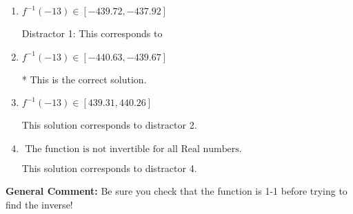 \documentclass{extbook}[14pt]
\begin{document}
\begin{enumerate}
{\begin{enumerate}[label=\Alph*.]
 This solution corresponds to distractor 3.
\item \( f^{-1}(-13) \in [-439.72, -437.92] \)

 Distractor 1: This corresponds to 
\item \( f^{-1}(-13) \in [-440.63, -439.67] \)

* This is the correct solution.
\item \( f^{-1}(-13) \in [439.31, 440.26] \)

 This solution corresponds to distractor 2.
\item \( \text{ The function is not invertible for all Real numbers. } \)

 This solution corresponds to distractor 4.
\end{enumerate}

\textbf{General Comment:} Be sure you check that the function is 1-1 before trying to find the inverse!
}
\end{enumerate}
\end{document}
